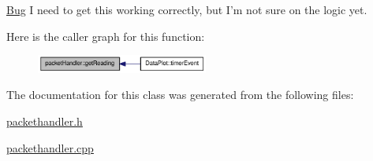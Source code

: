 \begin{Desc}
\item[\hyperlink{bug__bug000002}{Bug}]I need to get this working correctly, but I'm not sure on the logic yet. \end{Desc}




Here is the caller graph for this function:\nopagebreak
\begin{figure}[H]
\begin{center}
\leavevmode
\includegraphics[width=160pt]{classpacketHandler_aec6fa94602daa18227491b76001152cb_icgraph}
\end{center}
\end{figure}




The documentation for this class was generated from the following files:\begin{DoxyCompactItemize}
\item 
\hyperlink{packethandler_8h}{packethandler.h}\item 
\hyperlink{packethandler_8cpp}{packethandler.cpp}\end{DoxyCompactItemize}
